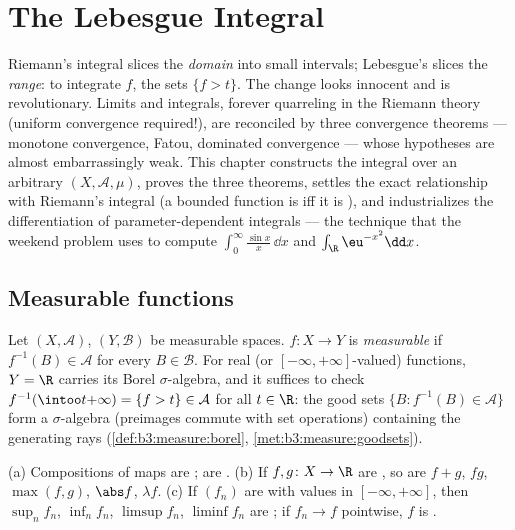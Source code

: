 \chapter{The Lebesgue Integral}\label{ch:b3:lebesgue}

Riemann's integral slices the \emph{domain} into small
intervals; Lebesgue's slices the \emph{range}: to integrate
$f$,  the sets $\{f > t\}$. The change looks innocent
and is revolutionary. Limits and integrals, forever quarreling
in the Riemann theory (uniform convergence required!), are
reconciled by three convergence theorems --- monotone
convergence, Fatou, dominated convergence --- whose hypotheses
are almost embarrassingly weak. This chapter constructs the
integral over an arbitrary  $(X, \mathcal A,
\mu)$, proves the three theorems, settles the exact
relationship with Riemann's integral (a bounded function is
 iff it is  ), and
industrializes the differentiation of parameter-dependent
integrals --- the technique that the weekend problem uses to
compute $\int_0^\infty\frac{\sin x}x\,\dd x$ and
$\int_\R \eu^{-x^2}\dd x$.

\section{Measurable functions}

\begin{definition}\label{def:b3:lebesgue:measurable}
Let $(X, \mathcal A)$, $(Y, \mathcal B)$ be measurable spaces.
$f \colon X \to Y$ is \emph{measurable} if $f^{-1}(B) \in \mathcal A$ for every $B \in
\mathcal B$. For real (or $[-\infty,+\infty]$-valued)
functions, $Y = \R$ carries its Borel $\sigma$-algebra, and it
suffices to check $f^{-1}(\intoo t{+\infty}) = \{f > t\} \in
\mathcal A$ for all $t \in \R$: the good sets $\{B :
f^{-1}(B) \in \mathcal A\}$ form a $\sigma$-algebra
(preimages commute with set operations) containing the
generating rays (\cref{def:b3:measure:borel},
\cref{met:b3:measure:goodsets}).
\end{definition}

\begin{proposition}\label{prop:b3:lebesgue:stability}
(a) Compositions of  maps are ;  are .
(b) If $f, g \colon X \to \R$ are , so are $f + g$,
$fg$, $\max(f,g)$, $\abs f$, $\lambda f$.
(c) If $(f_n)$ are  with values in
$[-\infty, +\infty]$, then $\sup_nf_n$, $\inf_nf_n$,
$\limsup f_n$, $\liminf f_n$ are ; if $f_n \to f$
pointwise, $f$ is .
\end{proposition}

